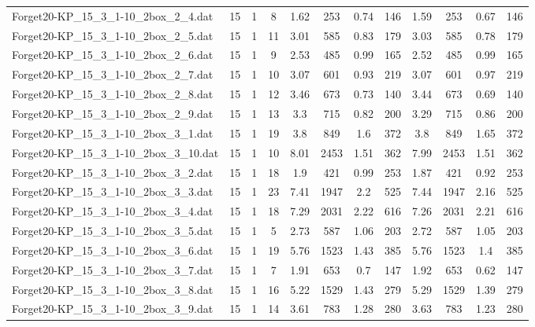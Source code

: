 \begin{sidewaystable}[!ht]
{\begin{tabular}{lccccccccccc}
Forget20-KP\_15\_3\_1-10\_2box\_2\_4.dat & 15 & 1 & 8 & 1.62 & 253 & 0.74 & 146 & 1.59 & 253 &  \textcolor{blue2}{0.67} & 146 \\
Forget20-KP\_15\_3\_1-10\_2box\_2\_5.dat & 15 & 1 & 11 & 3.01 & 585 & 0.83 & 179 & 3.03 & 585 &  \textcolor{blue2}{0.78} & 179 \\
Forget20-KP\_15\_3\_1-10\_2box\_2\_6.dat & 15 & 1 & 9 & 2.53 & 485 &  \textcolor{blue2}{0.99} & 165 & 2.52 & 485 &  \textcolor{blue2}{0.99} & 165 \\
Forget20-KP\_15\_3\_1-10\_2box\_2\_7.dat & 15 & 1 & 10 & 3.07 & 601 &  \textcolor{blue2}{0.93} & 219 & 3.07 & 601 & 0.97 & 219 \\
Forget20-KP\_15\_3\_1-10\_2box\_2\_8.dat & 15 & 1 & 12 & 3.46 & 673 & 0.73 & 140 & 3.44 & 673 & 0.69 & 140 \\
Forget20-KP\_15\_3\_1-10\_2box\_2\_9.dat & 15 & 1 & 13 & 3.3 & 715 & 0.82 & 200 & 3.29 & 715 & 0.86 & 200 \\
Forget20-KP\_15\_3\_1-10\_2box\_3\_1.dat & 15 & 1 & 19 & 3.8 & 849 &  \textcolor{blue2}{1.6} & 372 & 3.8 & 849 & 1.65 & 372 \\
Forget20-KP\_15\_3\_1-10\_2box\_3\_10.dat & 15 & 1 & 10 & 8.01 & 2453 &  \textcolor{blue2}{1.51} & 362 & 7.99 & 2453 &  \textcolor{blue2}{1.51} & 362 \\
Forget20-KP\_15\_3\_1-10\_2box\_3\_2.dat & 15 & 1 & 18 & 1.9 & 421 & 0.99 & 253 & 1.87 & 421 &  \textcolor{blue2}{0.92} & 253 \\
Forget20-KP\_15\_3\_1-10\_2box\_3\_3.dat & 15 & 1 & 23 & 7.41 & 1947 & 2.2 & 525 & 7.44 & 1947 & 2.16 & 525 \\
Forget20-KP\_15\_3\_1-10\_2box\_3\_4.dat & 15 & 1 & 18 & 7.29 & 2031 & 2.22 & 616 & 7.26 & 2031 &  \textcolor{blue2}{2.21} & 616 \\
Forget20-KP\_15\_3\_1-10\_2box\_3\_5.dat & 15 & 1 & 5 & 2.73 & 587 & 1.06 & 203 & 2.72 & 587 &  \textcolor{blue2}{1.05} & 203 \\
Forget20-KP\_15\_3\_1-10\_2box\_3\_6.dat & 15 & 1 & 19 & 5.76 & 1523 & 1.43 & 385 & 5.76 & 1523 &  \textcolor{blue2}{1.4} & 385 \\
Forget20-KP\_15\_3\_1-10\_2box\_3\_7.dat & 15 & 1 & 7 & 1.91 & 653 & 0.7 & 147 & 1.92 & 653 &  \textcolor{blue2}{0.62} & 147 \\
Forget20-KP\_15\_3\_1-10\_2box\_3\_8.dat & 15 & 1 & 16 & 5.22 & 1529 & 1.43 & 279 & 5.29 & 1529 &  \textcolor{blue2}{1.39} & 279 \\
Forget20-KP\_15\_3\_1-10\_2box\_3\_9.dat & 15 & 1 & 14 & 3.61 & 783 & 1.28 & 280 & 3.63 & 783 &  \textcolor{blue2}{1.23} & 280 \\

\end{tabular}}
\end{sidewaystable}
